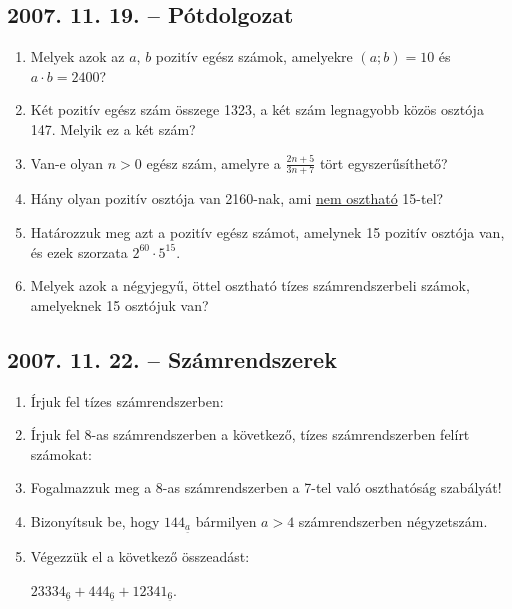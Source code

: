 \subsection*{2007. 11. 19. -- Pótdolgozat}
\begin{enumerate}
\item Melyek azok az $a$, $b$ pozitív egész számok, amelyekre $(a;b)=10$ és $a\cdot b=2400$?
\item Két pozitív egész szám összege 1323, a két szám legnagyobb közös osztója 147. Melyik ez a két szám?
\item Van-e olyan $n>0$ egész szám, amelyre a $\displaystyle{\frac{2n+5}{3n+7}}$ tört egyszerűsíthető?
\item Hány olyan pozitív osztója van 2160-nak, ami \underline{nem osztható} 15-tel?
\item Határozzuk meg azt a pozitív egész számot, amelynek 15 pozitív osztója van, és ezek szorzata $2^{60}\cdot5^{15}$.
\item Melyek azok a négyjegyű, öttel osztható tízes számrendszerbeli számok, amelyeknek 15 osztójuk van?
\end{enumerate}


\subsection*{2007. 11. 22. -- Számrendszerek}
\begin{enumerate}
\item Írjuk fel tízes számrendszerben:
\item Írjuk fel 8-as számrendszerben a következő, tízes számrendszerben felírt számokat:
\item Fogalmazzuk meg a 8-as számrendszerben a 7-tel való oszthatóság szabályát!
\item Bizonyítsuk be, hogy $144_{\underline{a}}$ bármilyen $a>4$ számrendszerben négyzetszám.
\item Végezzük el a következő összeadást:

$23334_{\underline{6}}+444_{\underline{6}}+12341_{\underline{6}}$.
\end{enumerate}


